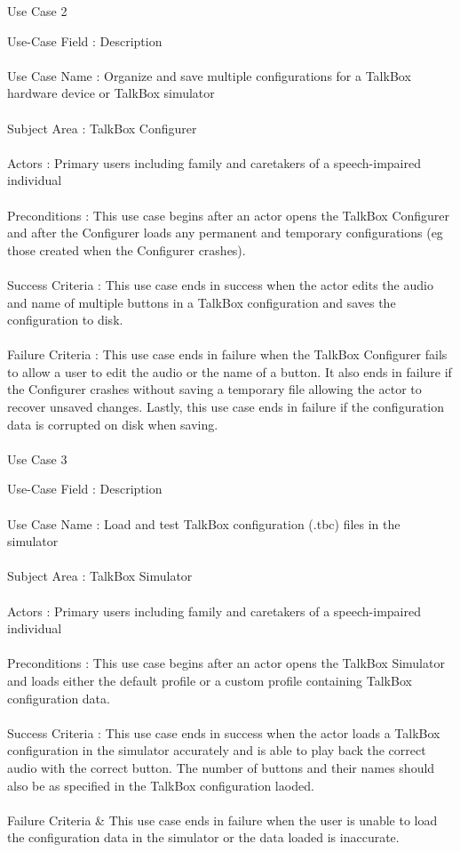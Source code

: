 \hline
Use Case 2

Use-Case Field : Description \\ \\
Use Case Name : Organize and save multiple configurations for a TalkBox hardware device or TalkBox simulator \\ \\
Subject Area : TalkBox Configurer \\ \\
Actors : Primary users including family and caretakers of a speech-impaired individual \\ \\
Preconditions : This use case begins after an actor opens the TalkBox Configurer and after the Configurer loads any permanent and temporary configurations (eg those created when the Configurer crashes). \\ \\
Success Criteria : This use case ends in success when the actor edits the audio and name of multiple buttons in a TalkBox configuration and saves the configuration to disk. \\ \\
Failure Criteria : This use case ends in failure when the TalkBox Configurer fails to allow a user to edit the audio or the name of a button. It also ends in failure if the Configurer crashes without saving a temporary file allowing the actor to recover unsaved changes. Lastly, this use case ends in failure if the configuration data is corrupted on disk when saving. \\ \\

\hline
Use Case 3

Use-Case Field : Description \\ \\
Use Case Name :  Load and test TalkBox configuration (.tbc) files in the simulator \\ \\
Subject Area : TalkBox Simulator\\ \\
Actors : Primary users including family and caretakers of a speech-impaired individual \\ \\
Preconditions : This use case begins after an actor opens the TalkBox Simulator and loads either the default profile or a custom profile containing TalkBox configuration data. \\ \\
Success Criteria : This use case ends in success when the actor loads a TalkBox configuration in the simulator accurately and is able to play back the correct audio with the correct button. The number of buttons and their names should also be as specified in the TalkBox configuration laoded. \\ \\
Failure Criteria & This use case ends in failure when the user is unable to load the configuration data in the simulator or the data loaded is inaccurate. \\ \\

